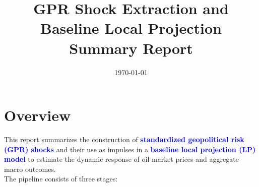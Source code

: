 \documentclass[12pt]{article}
\title{GPR Shock Extraction and Baseline Local Projection \\ \large Summary Report}
\author{}
\date{\today}
\begin{document}
\maketitle

\section{Overview}

This report summarizes the construction of
\textcolor{blue}{\textbf{standardized geopolitical risk (GPR) shocks}} and their
use as impulses in a
\textcolor{blue}{\textbf{baseline local projection (LP) model}} to estimate the
dynamic response of oil-market prices and aggregate macro outcomes.
\\

The pipeline consists of three stages:
\end{document}

